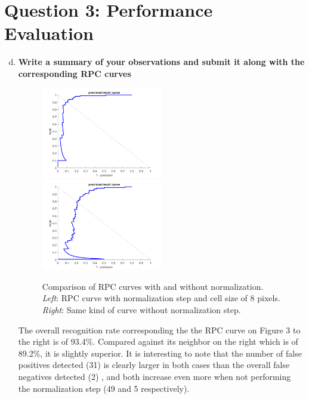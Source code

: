 \documentclass[12pt]{article}
\begin{document}
\newpage
\section*{Question 3: Performance Evaluation}
\begin{enumerate}[a)]
	\setcounter{enumi}{3}
	

	\item
        \textbf{Write a summary of your observations and submit it along with the corresponding RPC curves}\\
        
        \begin{figure}[h]			
        	\includegraphics[width=0.5\textwidth]{rpc_norm8}
        	\includegraphics[width=0.5\textwidth]{rpc_not_norm8}
        	\caption{Comparison of RPC curves with and without normalization. \textit{Left}: RPC curve with normalization step and cell size of 8 pixels. \textit{Right}: Same kind of curve without normalization step.}
        \end{figure}
        
        The overall recognition rate corresponding the the RPC curve on Figure 3 to the right is of 93.4\%. Compared against its neighbor on the right which is of 89.2\%, it is slightly superior. It is interesting to note that the number of false positives detected (31) is clearly larger in both cases than the overall false negatives detected (2) , and both increase even more when not performing the normalization step (49 and 5 respectively).
        

\end{enumerate}
\end{document}
